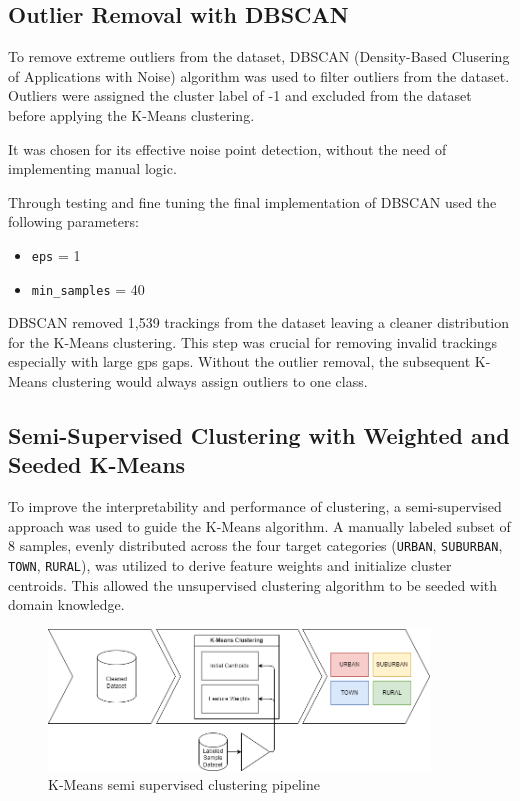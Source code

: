 \documentclass[a4paper,12pt,twoside]{scrreprt}
\begin{document}
\subsection{Outlier Removal with DBSCAN}
To remove extreme outliers from the dataset, DBSCAN (Density-Based Clusering
of Applications with Noise) algorithm was used to filter outliers from the
dataset.
Outliers were assigned the cluster label of -1 and excluded from the dataset
before applying the K-Means clustering.

It was chosen for its effective noise point detection, without the need of
implementing manual logic.

Through testing and fine tuning the final implementation of DBSCAN used the
following parameters:
\begin{itemize}
  \item \texttt{eps} = 1
  \item \texttt{min\_samples} = 40
\end{itemize}

DBSCAN removed 1,539 trackings from the dataset leaving a cleaner distribution
for the K-Means clustering.
This step was crucial for removing invalid trackings especially with large gps
gaps. Without the outlier removal, the subsequent K-Means clustering would
always assign
outliers to one class.

\subsection{Semi-Supervised Clustering with Weighted and Seeded K-Means}


To improve the interpretability and performance of clustering, a
semi-supervised approach was used to guide the K-Means algorithm. A manually
labeled subset of 8 samples, evenly distributed across the four target
categories (\texttt{URBAN}, \texttt{SUBURBAN}, \texttt{TOWN}, \texttt{RURAL}),
was utilized to derive feature weights and initialize cluster centroids. This
allowed the unsupervised clustering algorithm to be seeded with domain
knowledge.

\begin{figure}[htbp]
  \centering

  \includegraphics[width=0.9\textwidth]{Diagrams/drawio/implementation/clustering_pipeline.png}
  \caption{K-Means semi supervised clustering pipeline}
  \label{fig:kmeans-clustering-pipline}
\end{figure}
\FloatBarrier
\end{document}
